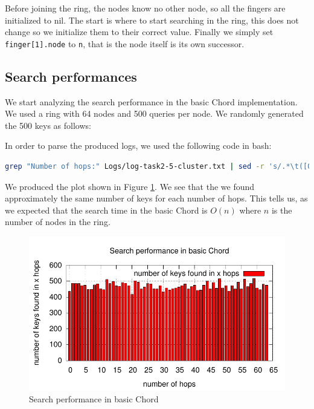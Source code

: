 \documentclass[a4paper, 11pt]{article}
\theoremstyle{plain}
\theoremstyle{definition}
\begin{document}
    Before joining the ring, the nodes know no other node, so all the fingers are initialized to nil. The
    start is where to start searching in the ring, this does not change so we initialize them to their correct
    value. Finally we simply set \texttt{finger[1].node} to \texttt{n}, that is the node itself is its own
    successor.


  \subsection{Search performances}
  \label{sec:search-performances}
  
    We start analyzing the search performance in the basic Chord implementation. We used a ring with 64 nodes
    and 500 queries per node. We randomly generated the 500 keys as follows:
    
    

   
    In order to parse the produced logs, we used the following code in bash:
\begin{lstlisting}[style=luaCode, language=bash, caption=Parser for the logs]
grep "Number of hops:" Logs/log-task2-5-cluster.txt | sed -r 's/.*\t([0-9]{1,2})$/\1/g' | sort -n | uniq -c | sed -r 's/ +([0-9]+)/\2 \1/g' >> ParsedLogs/log-task2-5-cluster.txt
\end{lstlisting}
    
    We produced the plot shown in Figure \ref{fig:search-basic-chord}. We see that the we found approximately
    the same number of keys for each number of hops. This tells us, as we expected that the search time in the
    basic Chord is $O(n)$ where $n$ is the number of nodes in the ring. 


    \begin{figure}[h]
      \centering
      \includegraphics{plots/task2-2-cluster.pdf}
      \caption{Search performance in basic Chord}
      \label{fig:search-basic-chord}
    \end{figure}
\end{document}
